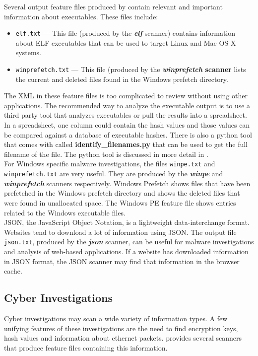 \documentclass[11pt]{article} %
\begin{document}
Several output feature files produced by \bulk contain relevant and important information about executables. These files include:
\begin{itemize}
\item \texttt{elf.txt} --- This file (produced by the \textbf{\textit{elf}} scanner) contains information about ELF executables that can be used to target Linux and Mac OS X systems.
\item \texttt{winprefetch.txt} --- This file (produced by the \textbf{\textit{winprefetch} scanner} lists the current and deleted files found in the Windows prefetch directory.
\end{itemize}
The XML in these feature files is too complicated to review without using other applications. The recommended way to analyze the executable output is to use a third party tool that analyzes executables or pull the results into a spreadsheet. In a spreadsheet, one column could contain the hash values and those values can be compared against a database of executable hashes. There is also a python tool that comes with \bulk called \textbf{identify\_filenames.py} that can be used to get the full filename of the file. The python tool is discussed in more detail in \textbf{}.\\

For Windows specific malware investigations, the files \texttt{winpe.txt} and \texttt{winprefetch.txt} are very useful. They are produced by the \textbf{\textit{winpe}} and \textbf{\textit{winprefetch}} scanners respectively.  Windows Prefetch shows files that have been prefetched in the Windows prefetch directory and shows the deleted files that were found in unallocated space. The Windows PE feature file shows entries related to the Windows executable files. \\

JSON, the JavaScript Object Notation, is a lightweight data-interchange format. Websites tend to download a lot of information using JSON. The output file \texttt{json.txt}, produced by the \textbf{\textit{json}} scanner, can be useful for malware investigations and analysis of web-based applications. If a website has downloaded information in JSON format, the JSON scanner may find that information in the browser cache. 

\subsection{Cyber Investigations}
\label{cyber}
Cyber investigations may scan a wide variety of information types. A few unifying features of these investigations are the need to find encryption keys, hash values and information about ethernet packets. \bulk provides several scanners that produce feature files containing this information.\\
\end{document}
